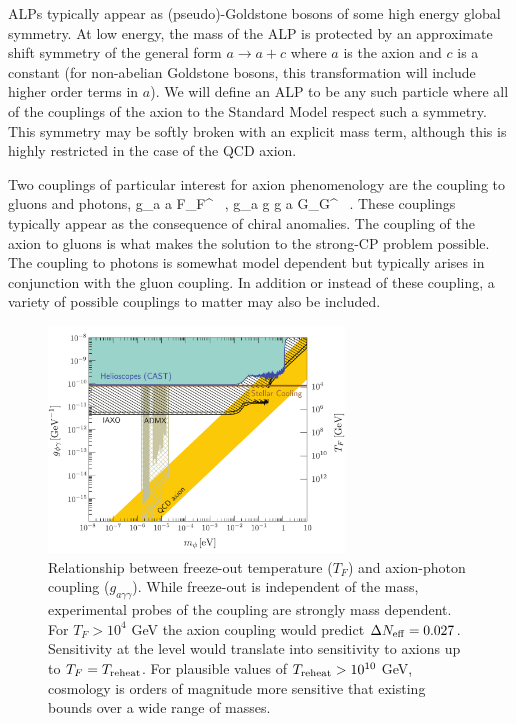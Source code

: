 ALPs typically appear as (pseudo)-Goldstone bosons of some high energy global symmetry.  At low energy, the mass of the ALP is protected by an approximate shift symmetry of the general form $a \to a + c$ where $a$ is the axion and $c$ is a constant (for non-abelian Goldstone bosons, this transformation will include higher order terms in $a$).  We will define an ALP to be any such particle where all of the couplings of the axion to the Standard Model respect such a symmetry.  This symmetry may be softly broken with an explicit mass term, although this is highly restricted in the case of the QCD axion.

Two couplings of particular interest for axion phenomenology are the coupling to gluons and photons, 
\beq
{} g_{a \gamma \gamma} a \tilde F_{\mu \nu}F^{\mu\nu} \ , \qquad \qquad {} g_{a g g} a \tilde G_{\mu \nu}G^{\mu\nu}  \ .
\eeq
These couplings typically appear as the consequence of chiral anomalies.  The coupling of the axion to gluons is what makes the solution to the strong-CP problem possible.  The coupling to photons is somewhat model dependent but typically arises in conjunction with the gluon coupling.  In addition or instead of these coupling, a variety of possible couplings to matter may also be included.

\begin{figure}[h!]
\centering \includegraphics[width=0.70\textwidth]{Neutrinos/AxionPhotonWithFuture.pdf}
\caption{Relationship between freeze-out temperature ($T_F$) and axion-photon coupling ($g_{a\gamma\gamma}$).  While freeze-out is independent of the mass, experimental probes of the coupling are strongly mass dependent.  For $T_F > 10^4$ GeV the axion coupling would predict $\Delta N_{\rm eff} = 0.027$.  Sensitivity at the level would translate into sensitivity to axions up to $T_F = T_{\rm reheat}$.  For plausible values of $T_{\rm reheat} > 10^{10}$ GeV, cosmology is orders of magnitude more sensitive that existing bounds over a wide range of masses.}
\label{fig:axionphoton}
\end{figure}

